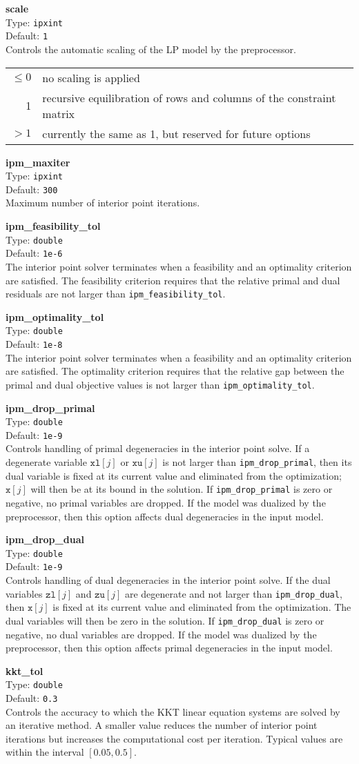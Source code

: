 \documentclass{article}
\newcommand{\ct}{\texttt}
\newcommand{\param}[4]{
  \noindent\begin{minipage}{\textwidth}
    \textbf{#1}\\
    Type: \ct{#2}\\
    Default: \ct{#3}\\
    #4
  \end{minipage}
  \vskip 1\baselineskip
}
\newcommand{\x}{\ct{x}}
\newcommand{\xl}{\ct{xl}}
\newcommand{\xu}{\ct{xu}}
\newcommand{\zl}{\ct{zl}}
\newcommand{\zu}{\ct{zu}}
\begin{document}
\param{scale}{ipxint}{1}{
  Controls the automatic scaling of the LP model by the preprocessor. \\
  \begin{tabular}{rl}
    $\le0$ & no scaling is applied \\
    1 & recursive equilibration of rows and columns of the constraint matrix \\
    $>1$ & currently the same as 1, but reserved for future options
  \end{tabular}
}

\param{ipm\_maxiter}{ipxint}{300}{
  Maximum number of interior point iterations.
}

\param{ipm\_feasibility\_tol}{double}{1e-6}{
  The interior point solver terminates when a feasibility and an optimality
  criterion are satisfied. The feasibility criterion requires that the relative
  primal and dual residuals are not larger than \ct{ipm\_feasibility\_tol}.
}

\param{ipm\_optimality\_tol}{double}{1e-8}{
  The interior point solver terminates when a feasibility and an optimality
  criterion are satisfied. The optimality criterion requires that the relative
  gap between the primal and dual objective values is not larger than
  \ct{ipm\_optimality\_tol}.
}

\param{ipm\_drop\_primal}{double}{1e-9}{
  Controls handling of primal degeneracies in the interior point solve. If a
  degenerate variable $\xl[j]$ or $\xu[j]$ is not larger than
  \ct{ipm\_drop\_primal}, then its dual variable is fixed at its current value
  and eliminated from the optimization; $\x[j]$ will then be at its bound in the
  solution. If \ct{ipm\_drop\_primal} is zero or negative, no primal variables
  are dropped. If the model was dualized by the preprocessor, then this option
  affects dual degeneracies in the input model.
}

\param{ipm\_drop\_dual}{double}{1e-9}{
  Controls handling of dual degeneracies in the interior point solve. If the
  dual variables $\zl[j]$ and $\zu[j]$ are degenerate and not larger than
  \ct{ipm\_drop\_dual}, then $\x[j]$ is fixed at its current value and
  eliminated from the optimization. The dual variables will then be zero in the
  solution. If \ct{ipm\_drop\_dual} is zero or negative, no dual variables are
  dropped. If the model was dualized by the preprocessor, then this option
  affects primal degeneracies in the input model.
}

\param{kkt\_tol}{double}{0.3}{
  Controls the accuracy to which the KKT linear equation systems are solved by
  an iterative method. A smaller value reduces the number of interior point
  iterations but increases the computational cost per iteration. Typical values
  are within the interval $[0.05,0.5]$.
}
\end{document}
